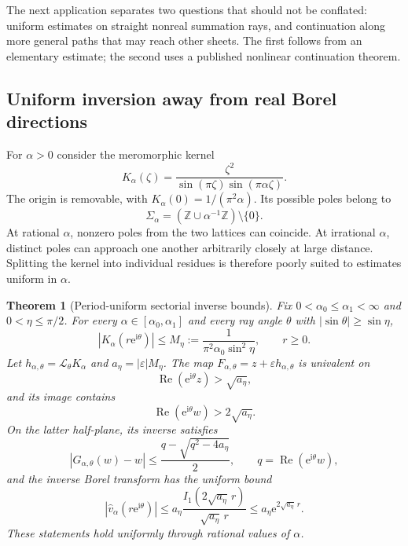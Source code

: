 \documentclass[11pt,a4paper]{article}
\numberwithin{equation}{section}
\newtheorem{theorem}{Theorem}[section]
\theoremstyle{definition}
\theoremstyle{remark}
\newcommand{\Z}{\mathbb Z}
\newcommand{\ii}{\mathrm i}
\newcommand{\e}{\mathrm e}
\newcommand{\Lap}{\mathcal L}
\newcommand{\Rea}{\operatorname{Re}}
\begin{document}
The next application separates two questions that should not be conflated:
uniform estimates on straight nonreal summation rays, and continuation along
more general paths that may reach other sheets. The first follows from an
elementary estimate; the second uses a published nonlinear continuation theorem.

\subsection{Uniform inversion away from real Borel directions}

For $\alpha>0$ consider the meromorphic kernel
\begin{equation}\label{eq:sine-kernel}
 K_\alpha(\zeta)=
 \frac{\zeta^2}{\sin(\pi\zeta)\sin(\pi\alpha\zeta)}.
\end{equation}
The origin is removable, with $K_\alpha(0)=1/(\pi^2\alpha)$.
Its possible poles belong to
\[
 \Sigma_\alpha=(\Z\cup\alpha^{-1}\Z)\setminus\{0\}.
\]
At rational $\alpha$, nonzero poles from the two lattices can coincide.
At irrational $\alpha$, distinct poles can approach one another arbitrarily
closely at large distance. Splitting the kernel into individual residues is
therefore poorly suited to estimates uniform in $\alpha$.

\begin{theorem}[Period-uniform sectorial inverse bounds]\label{thm:sine-uniform}
Fix $0<\alpha_0\le\alpha_1<\infty$ and $0<\eta\le\pi/2$.
For every $\alpha\in[\alpha_0,\alpha_1]$ and every ray angle $\theta$
with $|\sin\theta|\ge\sin\eta$,
\begin{equation}\label{eq:sine-uniform}
 |K_\alpha(r\e^{\ii\theta})|
 \le M_\eta:=\frac1{\pi^2\alpha_0\sin^2\eta},
 \qquad r\ge0.
\end{equation}
Let $h_{\alpha,\theta}=\Lap_\theta K_\alpha$ and
$a_\eta=|\varepsilon|M_\eta$.
The map $F_{\alpha,\theta}=z+\varepsilon h_{\alpha,\theta}$ is
univalent on
\[
 \Rea(\e^{\ii\theta}z)>\sqrt{a_\eta},
\]
and its image contains
\[
 \Rea(\e^{\ii\theta}w)>2\sqrt{a_\eta}.
\]
On the latter half-plane, its inverse satisfies
\[
 |G_{\alpha,\theta}(w)-w|
 \le \frac{q-\sqrt{q^2-4a_\eta}}2,
 \qquad q=\Rea(\e^{\ii\theta}w),
\]
and the inverse Borel transform has the uniform bound
\[
 |\widehat v_\alpha(r\e^{\ii\theta})|
 \le a_\eta\frac{I_1(2\sqrt{a_\eta}\,r)}
                  {\sqrt{a_\eta}\,r}
 \le a_\eta\e^{2\sqrt{a_\eta}\,r}.
\]
These statements hold uniformly through rational values of $\alpha$.
\end{theorem}
\end{document}
